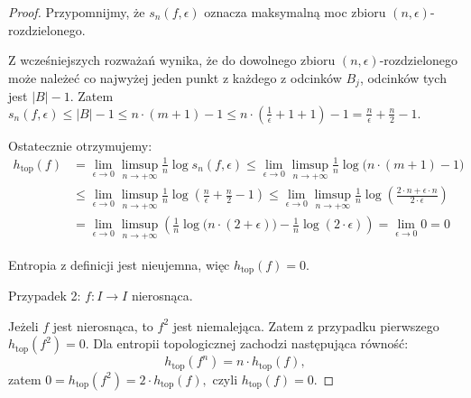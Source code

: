 \documentclass[licencjacka]{pwr_wmat_praca_dyplomowa}
\theoremstyle{plain}
\numberwithin{theorem}{chapter}
\theoremstyle{definition}
\numberwithin{theorem}{chapter}
\begin{document}
\begin{proof}
Przypomnijmy, że $s_n(f, \epsilon)$ oznacza maksymalną moc zbioru $(n, \epsilon)$-rozdzielonego. 


Z wcześniejszych rozważań wynika, że do dowolnego zbioru $(n, \epsilon)$-rozdzielonego może należeć co najwyżej jeden punkt z każdego z odcinków $B_j$, odcinków tych jest $|B|-1.$ Zatem $s_n(f, \epsilon) \leq |B|-1 \leq n \cdot (m+1) - 1 \leq n \cdot (\frac{1}{\epsilon}+1+1) - 1 = \frac{n}{\epsilon} + \frac{n}{2} - 1.$



Ostatecznie otrzymujemy:
\begin{equation}
\begin{aligned}
h_{\textrm{top}}(f) & = \lim_{\epsilon \rightarrow 0} \limsup_{n \rightarrow +\infty} \frac{1}{n} \log s_n(f, \epsilon) \leq \lim_{\epsilon \rightarrow 0} \limsup_{n \rightarrow +\infty} \frac{1}{n} \log \big( n \cdot (m+1) - 1 \big) \\
& \leq \lim_{\epsilon \rightarrow 0} \limsup_{n \rightarrow +\infty} \frac{1}{n} \log \left( \frac{n}{\epsilon} + \frac{n}{2} - 1 \right) \leq \lim_{\epsilon \rightarrow 0} \limsup_{n \rightarrow +\infty} \frac{1}{n} \log \left( \frac{2 \cdot n + \epsilon \cdot n}{2 \cdot \epsilon}\right) \\
& = \lim_{\epsilon \rightarrow 0} \limsup_{n \rightarrow +\infty} \left(\frac{1}{n} \log \big(n \cdot (2 + \epsilon)\big) - \frac{1}{n} \log ( 2 \cdot \epsilon )\right) = \lim_{\epsilon \rightarrow 0} 0 = 0
\end{aligned}
\end{equation}

Entropia z definicji jest nieujemna, więc $h_{\textrm{top}}(f) = 0.$

\item[Przypadek 2: $f: I \rightarrow I$ nierosnąca.]

Jeżeli $f$ jest nierosnąca, to $f^2$ jest niemalejąca. Zatem z przypadku pierwszego $h_{\textrm{top}}(f^2) = 0$. Dla entropii topologicznej zachodzi następująca równość: 
$$h_{\textrm{top}}(f^n) = n \cdot h_{\textrm{top}}(f),$$
zatem 
$0 = h_{\textrm{top}}(f^2) = 2 \cdot h_{\textrm{top}}(f),$
czyli
$h_{\textrm{top}}(f) = 0.$

\end{proof}
 
 
\end{document}
